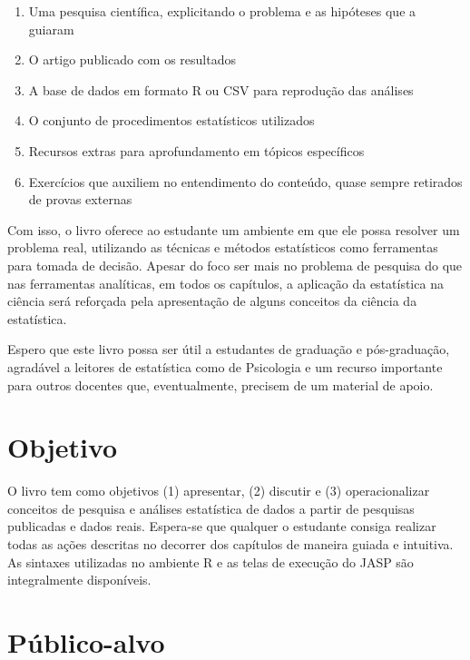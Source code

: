 \documentclass[
]{book}
\providecommand{\tightlist}{%
  \setlength{\itemsep}{0pt}\setlength{\parskip}{0pt}}
\begin{document}
\begin{enumerate}
\def\labelenumi{\arabic{enumi}.}
\tightlist
\item
  Uma pesquisa científica, explicitando o problema e as hipóteses que a guiaram\\
\item
  O artigo publicado com os resultados\\
\item
  A base de dados em formato R ou CSV para reprodução das análises\\
\item
  O conjunto de procedimentos estatísticos utilizados\\
\item
  Recursos extras para aprofundamento em tópicos específicos\\
\item
  Exercícios que auxiliem no entendimento do conteúdo, quase sempre retirados de provas externas
\end{enumerate}

Com isso, o livro oferece ao estudante um ambiente em que ele possa resolver um problema real, utilizando as técnicas e métodos estatísticos como ferramentas para tomada de decisão. Apesar do foco ser mais no problema de pesquisa do que nas ferramentas analíticas, em todos os capítulos, a aplicação da estatística na ciência será reforçada pela apresentação de alguns conceitos da ciência da estatística.

Espero que este livro possa ser útil a estudantes de graduação e pós-graduação, agradável a leitores de estatística como de Psicologia e um recurso importante para outros docentes que, eventualmente, precisem de um material de apoio.

\hypertarget{objetivo}{%
\section{Objetivo}\label{objetivo}}

O livro tem como objetivos (1) apresentar, (2) discutir e (3) operacionalizar conceitos de pesquisa e análises estatística de dados a partir de pesquisas publicadas e dados reais. Espera-se que qualquer o estudante consiga realizar todas as ações descritas no decorrer dos capítulos de maneira guiada e intuitiva. As sintaxes utilizadas no ambiente R e as telas de execução do JASP são integralmente disponíveis.

\hypertarget{puxfablico-alvo}{%
\section{Público-alvo}\label{puxfablico-alvo}}
\end{document}
